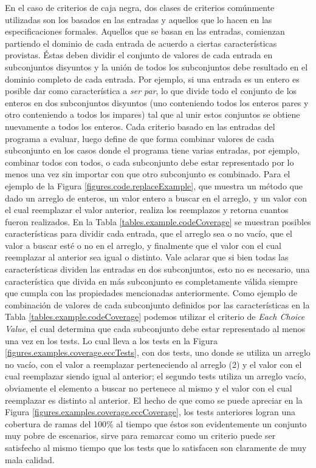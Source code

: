 En el caso de criterios de caja negra, dos clases de criterios com\'unmente utilizadas son los basados en las entradas y aquellos que lo hacen en las especificaciones formales. Aquellos que se basan en las entradas, comienzan partiendo el dominio de cada entrada de acuerdo a ciertas caracter\'isticas provistas. \'Estas deben dividir el conjunto de valores de cada entrada en subconjuntos disyuntos y la uni\'on de todos los subconjuntos debe resultado en el dominio completo de cada entrada. Por ejemplo, si una entrada es un entero es posible dar como caracter\'istica a \emph{ser par}, lo que divide todo el conjunto de los enteros en dos subconjuntos disyuntos (uno conteniendo todos los enteros pares y otro conteniendo a todos los impares) tal que al unir estos conjuntos se obtiene nuevamente a todos los enteros. Cada criterio basado en las entradas del programa a evaluar, luego define de que forma combinar valores de cada subconjunto en los casos donde el programa tiene varias entradas, por ejemplo, combinar todos con todos, o cada subconjunto debe estar representado por lo menos una vez sin importar con que otro subconjunto es combinado. Para el ejemplo de la Figura \ref{figures.code.replaceExample}, que muestra un m\'etodo que dado un arreglo de enteros, un valor entero a buscar en el arreglo, y un valor con el cual reemplazar el valor anterior, realiza los reemplazos y retorna cuantos fueron realizados. En la Tabla \ref{tables.example.codeCoverage} se muestran posibles caracter\'isticas para dividir cada entrada, que el arreglo sea o no vac\'io, que el valor a buscar est\'e o no en el arreglo, y finalmente que el valor con el cual reemplazar al anterior sea igual o distinto. Vale aclarar que si bien todas las caracter\'isticas dividen las entradas en dos subconjuntos, esto no es necesario, una caracter\'istica que divida en m\'as subconjunto es completamente v\'alida siempre que cumpla con las propiedades mencionadas anteriormente. Como ejemplo de combinaci\'on de valores de cada subconjunto definidos por las caracter\'isticas en la Tabla \ref{tables.example.codeCoverage} podemos utilizar el criterio de \emph{Each Choice Value}, el cual determina que cada subconjunto debe estar representado al menos una vez en los tests. Lo cual lleva a los tests en la Figura \ref{figures.examples.coverage.eccTests}, con dos tests, uno donde se utiliza un arreglo no vac\'io, con el valor a reemplazar perteneciendo al arreglo (2) y el valor con el cual reemplazar siendo igual al anterior; el segundo tests utiliza un arreglo vac\'io, obviamente el elemento a buscar no pertenece al mismo y el valor con el cual reemplazar es distinto al anterior. El hecho de que como se puede apreciar en la Figura \ref{figures.examples.coverage.eccCoverage}, los tests anteriores logran una cobertura de ramas del 100\% al tiempo que \'estos son evidentemente un conjunto muy pobre de escenarios, sirve para remarcar como un criterio puede ser satisfecho al mismo tiempo que los tests que lo satisfacen son claramente de muy mala calidad.

